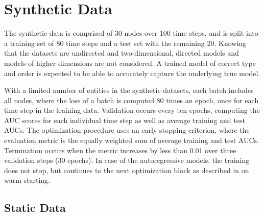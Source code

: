 

\section{Synthetic Data}

The synthetic data is comprised of 30 nodes over 100 time steps, and is split into a training set of 80 time steps and a test set with the remaining 20. Knowing that the datasets are undirected and two-dimensional, directed models and models of higher dimensions are not considered. A trained model of correct type and order is expected to be able to accurately capture the underlying true model.

With a limited number of entities in the synthetic datasets, each batch includes all nodes, where the loss of a batch is computed 80 times an epoch, once for each time step in the training data. Validation occurs every ten epochs, computing the AUC scores for each individual time step as well as average training and test AUCs.
The optimization procedure uses an early stopping criterion, where the evaluation metric is the equally weighted sum of average training and test AUCs. Termination occurs when the metric increases by less than 0.01 over three validation steps (30 epochs). In case of the autoregressive models, the training does not stop, but continues to the next optimization block as described in  on warm starting.



\subsection{Static Data}

